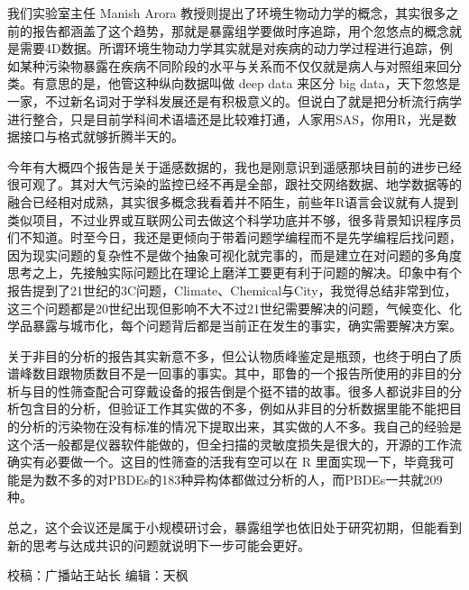 \documentclass[
]{book}
\begin{document}
我们实验室主任 Manish Arora 教授则提出了环境生物动力学的概念，其实很多之前的报告都涵盖了这个趋势，那就是暴露组学要做时序追踪，用个忽悠点的概念就是需要4D数据。所谓环境生物动力学其实就是对疾病的动力学过程进行追踪，例如某种污染物暴露在疾病不同阶段的水平与关系而不仅仅就是病人与对照组来回分类。有意思的是，他管这种纵向数据叫做 deep data 来区分 big data，天下忽悠是一家，不过新名词对于学科发展还是有积极意义的。但说白了就是把分析流行病学进行整合，只是目前学科间术语墙还是比较难打通，人家用SAS，你用R，光是数据接口与格式就够折腾半天的。

今年有大概四个报告是关于遥感数据的，我也是刚意识到遥感那块目前的进步已经很可观了。其对大气污染的监控已经不再是全部，跟社交网络数据、地学数据等的融合已经相对成熟，其实很多概念我看着并不陌生，前些年R语言会议就有人提到类似项目，不过业界或互联网公司去做这个科学功底并不够，很多背景知识程序员们不知道。时至今日，我还是更倾向于带着问题学编程而不是先学编程后找问题，因为现实问题的复杂性不是做个抽象可视化就完事的，而是建立在对问题的多角度思考之上，先接触实际问题比在理论上磨洋工要更有利于问题的解决。印象中有个报告提到了21世纪的3C问题，Climate、Chemical与City，我觉得总结非常到位，这三个问题都是20世纪出现但影响不大不过21世纪需要解决的问题，气候变化、化学品暴露与城市化，每个问题背后都是当前正在发生的事实，确实需要解决方案。

关于非目的分析的报告其实新意不多，但公认物质峰鉴定是瓶颈，也终于明白了质谱峰数目跟物质数目不是一回事的事实。其中，耶鲁的一个报告所使用的非目的分析与目的性筛查配合可穿戴设备的报告倒是个挺不错的故事。很多人都说非目的分析包含目的分析，但验证工作其实做的不多，例如从非目的分析数据里能不能把目的分析的污染物在没有标准的情况下提取出来，其实做的人不多。我自己的经验是这个活一般都是仪器软件能做的，但全扫描的灵敏度损失是很大的，开源的工作流确实有必要做一个。这目的性筛查的活我有空可以在 R 里面实现一下，毕竟我可能是为数不多的对PBDEs的183种异构体都做过分析的人，而PBDEs一共就209种。

总之，这个会议还是属于小规模研讨会，暴露组学也依旧处于研究初期，但能看到新的思考与达成共识的问题就说明下一步可能会更好。

校稿：广播站王站长
编辑：天枫

  
\end{document}

